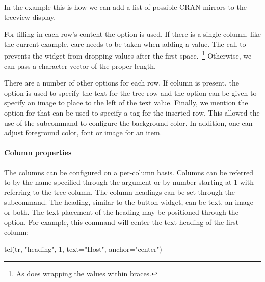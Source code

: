 In the example this is how we can add a list of possible CRAN mirrors
to the treeview display.
\begin{Schunk}
\end{Schunk}

For filling in each row's content the  option is used. If
there is a single column, like the current example, care needs to be
taken when adding a value. The call to  prevents
the widget from dropping values after the first space.~\footnote{As
  does wrapping the values within braces.} Otherwise, we can pass a
character vector of the proper length.


There are a number of other options for each row. If column 
is present, the  option is used to specify the text for the
tree row and the option  can be given to specify an image
to place to the left of the text value. Finally, we mention the
 option for  that can be used to specify a tag
for the inserted row. This allowed the use of the subcommand
 to configure the background
color. In addition, one can adjust foreground color, font or image for
an item.



\paragraph{Column properties}
The columns can be configured on a per-column basis. Columns can be
referred to by the name specified through the  argument
or by number starting at 1 with  referring to the tree
column. The column headings can be set through the
 subcommand. The heading, similar to
the button widget, can be text, an image or both. The text placement
of the heading may be positioned through the  option. For
example, this command will center the text heading of the first
column:
\begin{Schunk}
\begin{Sinput}
 tcl(tr, "heading", 1, text="Host", anchor="center")
\end{Sinput}
\end{Schunk}

